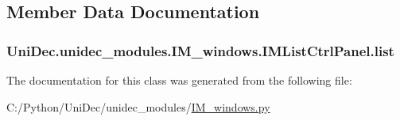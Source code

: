 \subsection{Member Data Documentation}
\hypertarget{class_uni_dec_1_1unidec__modules_1_1_i_m__windows_1_1_i_m_list_ctrl_panel_a87c757576767757ab1a3387995b68311}{}
\subsubsection[{list}]{\setlength{\rightskip}{0pt plus 5cm}Uni\+Dec.\+unidec\+\_\+modules.\+I\+M\+\_\+windows.\+I\+M\+List\+Ctrl\+Panel.\+list}\label{class_uni_dec_1_1unidec__modules_1_1_i_m__windows_1_1_i_m_list_ctrl_panel_a87c757576767757ab1a3387995b68311}


The documentation for this class was generated from the following file\+:\begin{DoxyCompactItemize}
\item 
C\+:/\+Python/\+Uni\+Dec/unidec\+\_\+modules/\hyperlink{_i_m__windows_8py}{I\+M\+\_\+windows.\+py}\end{DoxyCompactItemize}
